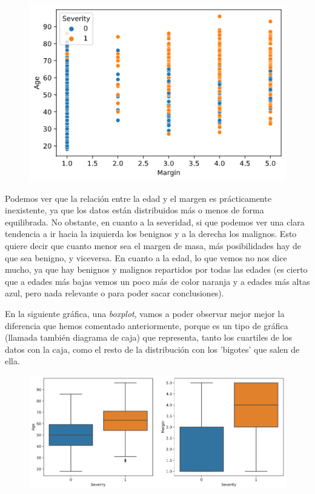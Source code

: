 \documentclass[11pt,a4paper]{article}
\begin{document}
\begin{figure}[H]
    \centering
    \includegraphics[scale=0.5]{img/scatter-age-margin.png}
\end{figure}

Podemos ver que la relación entre la edad y el margen es prácticamente inexistente, ya que los datos están distribuidos más o menos
de forma equilibrada. No obstante, en cuanto a la severidad, si que podemos ver una clara tendencia a ir hacia la izquierda los
benignos y a la derecha los malignos. Esto quiere decir que cuanto menor sea el margen de masa, más posibilidades hay de que sea
benigno, y viceversa. En cuanto a la edad, lo que vemos no nos dice mucho, ya que hay benignos y malignos repartidos por todas las
edades (es cierto que a edades más bajas vemos un poco más de color naranja y a edades más altas azul, pero nada relevante o para
poder sacar conclusiones).

En la siguiente gráfica, una \textit{boxplot}, vamos a poder observar mejor mejor la diferencia que hemos comentado anteriormente,
porque es un tipo de gráfica (llamada también diagrama de caja) que representa, tanto los cuartiles de los datos con la caja, como
el resto de la distribución con los 'bigotes' que salen de ella.

\begin{figure}[H]
    \centering
    \includegraphics[scale=0.4]{img/boxplot-age-margin.png}
\end{figure}
\end{document}

